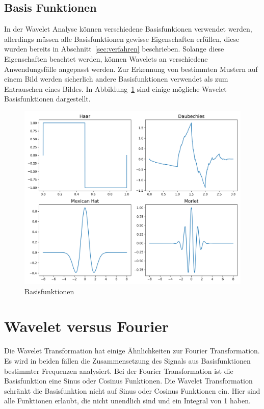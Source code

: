 \documentclass[12pt, a4paper, ngerman]{article}
\begin{document}
\subsection{Basis Funktionen}
\label{sec:basis_functions}

In der Wavelet Analyse können verschiedene Basisfunkionen verwendet werden,
allerdings müssen alle Basisfunktionen gewisse Eigenschaften erfüllen,
diese wurden bereits in Abschnitt~\ref{sec:verfahren} beschrieben.
Solange diese Eigenschaften beachtet werden,
können Wavelets an verschiedene Anwendungsfälle angepasst werden.
Zur Erkennung von bestimmten Mustern auf einem Bild
werden sicherlich andere Basisfunktionen verwendet als zum Entrauschen eines Bildes.
In Abbildung~\ref{fig:basis_functions} sind einige mögliche Wavelet Basisfunktionen dargestellt.

\begin{figure}
  \centering
  \includegraphics[width=\textwidth]{wavelets}
  \caption{Basisfunktionen}
  \label{fig:basis_functions}
\end{figure}

\section{Wavelet versus Fourier}

Die Wavelet Transformation hat einige Ähnlichkeiten zur Fourier Transformation.
Es wird in beiden fällen die Zusammensetzung des Signals aus Basisfunktionen bestimmter Frequenzen analysiert.
Bei der Fourier Transformation ist die Basisfunktion eine Sinus oder Cosinus Funktionen.
Die Wavelet Transformation schränkt die Basisfunktion nicht auf Sinus oder Cosinus Funktionen ein.
Hier sind alle Funktionen erlaubt, die nicht unendlich sind und ein Integral von 1 haben.
\end{document}
